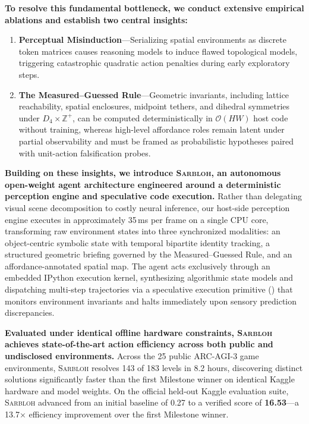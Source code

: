 \textbf{To resolve this fundamental bottleneck, we conduct extensive empirical ablations and establish two central insights:}
\begin{enumerate}
    \item \textbf{Perceptual Misinduction}---Serializing spatial environments as discrete token matrices causes reasoning models to induce flawed topological models, triggering catastrophic quadratic action penalties during early exploratory steps.
    \item \textbf{The Measured--Guessed Rule}---Geometric invariants, including lattice reachability, spatial enclosures, midpoint tethers, and dihedral symmetries under $D_4 \times \mathbb{Z}^+$, can be computed deterministically in $\mathcal{O}(HW)$ host code without training, whereas high-level affordance roles remain latent under partial observability and must be framed as probabilistic hypotheses paired with unit-action falsification probes.
\end{enumerate}

\textbf{Building on these insights, we introduce \textsc{Sarbloh}, an autonomous open-weight agent architecture engineered around a deterministic perception engine and speculative code execution.} Rather than delegating visual scene decomposition to costly neural inference, our host-side perception engine executes in approximately 35\,ms per frame on a single CPU core, transforming raw environment states into three synchronized modalities: an object-centric symbolic state with temporal bipartite identity tracking, a structured geometric briefing governed by the Measured--Guessed Rule, and an affordance-annotated spatial map. The agent acts exclusively through an embedded IPython execution kernel, synthesizing algorithmic state models and dispatching multi-step trajectories via a speculative execution primitive () that monitors environment invariants and halts immediately upon sensory prediction discrepancies.

\textbf{Evaluated under identical offline hardware constraints, \textsc{Sarbloh} achieves state-of-the-art action efficiency across both public and undisclosed environments.} Across the 25 public ARC-AGI-3 game environments, \textsc{Sarbloh} resolves 143 of 183 levels in 8.2 hours, discovering distinct solutions significantly faster than the first Milestone winner on identical Kaggle hardware and model weights. On the official held-out Kaggle evaluation suite, \textsc{Sarbloh} advanced from an initial baseline of 0.27 to a verified score of \textbf{16.53}---a 13.7$\times$ efficiency improvement over the first Milestone winner.


